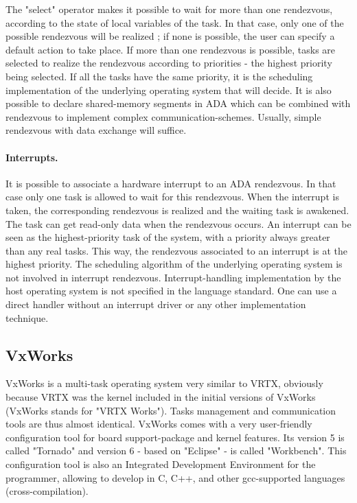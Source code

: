 \documentclass[10pt]{report}
\begin{document}
The "select" operator makes it possible to wait for more than one rendezvous, according to the state of local variables of the task.
In that case, only one of the possible rendezvous will be realized ; if none is possible, the user can specify a default action to take place. 
If more than one rendezvous is possible, tasks are selected to realize the rendezvous according to priorities - the highest priority being selected. 
If all the tasks have the same priority, it is the scheduling implementation of the underlying operating system
that will decide. It is also possible to declare shared-memory segments in ADA which can be combined with rendezvous to
implement complex communication-schemes. Usually, simple rendezvous with data exchange will suffice.

\paragraph{Interrupts.} It is possible to associate a hardware interrupt to an ADA rendezvous. In that case only one task is allowed
to wait for this rendezvous. When the interrupt is taken, the corresponding rendezvous is realized and the waiting
task is awakened. The task can get read-only data when the rendezvous occurs. An interrupt can be seen as the highest-priority 
task of the system, with a priority always greater than any real tasks. This way, the rendezvous associated to an interrupt is at the 
highest priority. The scheduling algorithm of the underlying operating system is not involved in interrupt rendezvous. Interrupt-handling
implementation by the host operating system is not specified in the language standard. One can use a direct handler without
an interrupt driver or any other implementation technique.

\subsection{VxWorks}

VxWorks is a multi-task operating system very similar to VRTX, obviously because VRTX was the kernel included in the initial versions 
of VxWorks (VxWorks stands for "VRTX Works"). Tasks management and communication tools are thus almost identical.
VxWorks comes with a very user-friendly configuration tool for board support-package and kernel features. Its version 5 is
called "Tornado" and version 6 - based on "Eclipse" - is called "Workbench". This configuration tool is also an
Integrated Development Environment for the programmer, allowing to develop in C, C++, and other gcc-supported languages (cross-compilation).
\end{document}
